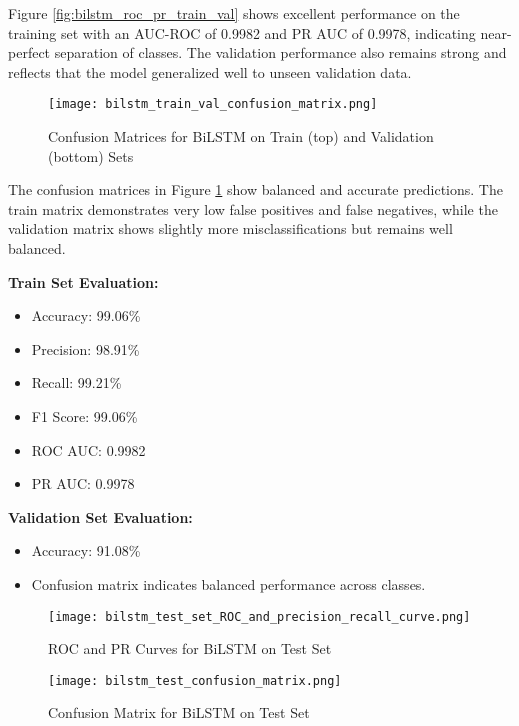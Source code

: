 \documentclass[12pt]{article}
\begin{document}
Figure \ref{fig:bilstm_roc_pr_train_val} shows excellent performance on the training set with an AUC-ROC of 0.9982 and PR AUC of 0.9978, indicating near-perfect separation of classes. The validation performance also remains strong and reflects that the model generalized well to unseen validation data.

\begin{figure}[H]
    \centering
    \texttt{[image: bilstm\_train\_val\_confusion\_matrix.png]}
    \caption{Confusion Matrices for BiLSTM on Train (top) and Validation (bottom) Sets}
    \label{fig:bilstm_conf_matrix_train_val}
\end{figure}

The confusion matrices in Figure \ref{fig:bilstm_conf_matrix_train_val} show balanced and accurate predictions. The train matrix demonstrates very low false positives and false negatives, while the validation matrix shows slightly more misclassifications but remains well balanced.

\vspace{1em}
\noindent
\textbf{Train Set Evaluation:}
\begin{itemize}
    \item Accuracy: 99.06\%
    \item Precision: 98.91\%
    \item Recall: 99.21\%
    \item F1 Score: 99.06\%
    \item ROC AUC: 0.9982
    \item PR AUC: 0.9978
\end{itemize}

\vspace{1em}
\noindent
\textbf{Validation Set Evaluation:}
\begin{itemize}
    \item Accuracy: 91.08\%
    \item Confusion matrix indicates balanced performance across classes.
\end{itemize}

\begin{figure}[H]
    \centering
    \texttt{[image: bilstm\_test\_set\_ROC\_and\_precision\_recall\_curve.png]}
    \caption{ROC and PR Curves for BiLSTM on Test Set}
    \label{fig:bilstm_test_roc_pr}
\end{figure}

\begin{figure}[H]
    \centering
    \texttt{[image: bilstm\_test\_confusion\_matrix.png]}
    \caption{Confusion Matrix for BiLSTM on Test Set}
    \label{fig:bilstm_test_conf_matrix}
\end{figure}
\end{document}

